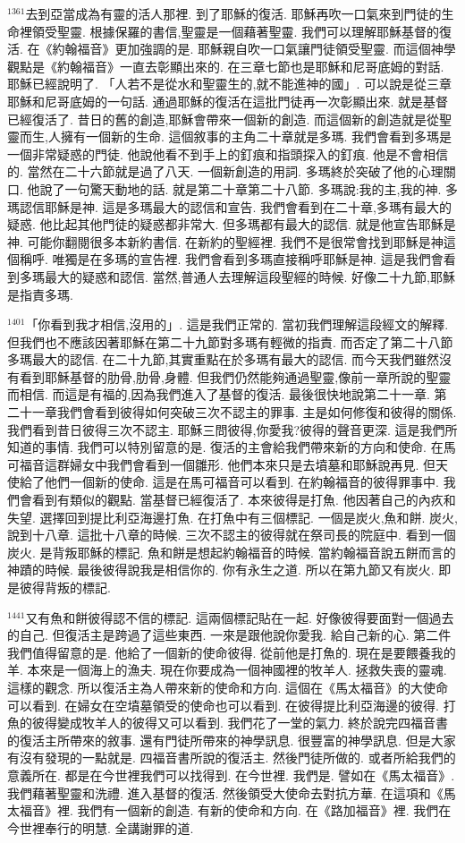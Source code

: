 \documentclass{book}
\begin{document}
$^{1361}$去到亞當成為有靈的活人那裡.
到了耶穌的復活.
耶穌再吹一口氣來到門徒的生命裡領受聖靈.
根據保羅的書信,聖靈是一個藉著聖靈.
我們可以理解耶穌基督的復活.
在《約翰福音》更加強調的是.
耶穌親自吹一口氣讓門徒領受聖靈.
而這個神學觀點是《約翰福音》一直去彰顯出來的.
在三章七節也是耶穌和尼哥底姆的對話.
耶穌已經說明了.
「人若不是從水和聖靈生的,就不能進神的國」.
可以說是從三章耶穌和尼哥底姆的一句話.
通過耶穌的復活在這批門徒再一次彰顯出來.
就是基督已經復活了.
昔日的舊的創造,耶穌會帶來一個新的創造.
而這個新的創造就是從聖靈而生,人擁有一個新的生命.
這個敘事的主角二十章就是多瑪.
我們會看到多瑪是一個非常疑惑的門徒.
他說他看不到手上的釘痕和指頭探入的釘痕.
他是不會相信的.
當然在二十六節就是過了八天.
一個新創造的用詞.
多瑪終於突破了他的心理關口.
他說了一句驚天動地的話.
就是第二十章第二十八節.
多瑪說:我的主,我的神.
多瑪認信耶穌是神.
這是多瑪最大的認信和宣告.
我們會看到在二十章,多瑪有最大的疑惑.
他比起其他門徒的疑惑都非常大.
但多瑪都有最大的認信.
就是他宣告耶穌是神.
可能你翻閱很多本新約書信.
在新約的聖經裡.
我們不是很常會找到耶穌是神這個稱呼.
唯獨是在多瑪的宣告裡.
我們會看到多瑪直接稱呼耶穌是神.
這是我們會看到多瑪最大的疑惑和認信.
當然,普通人去理解這段聖經的時候.
好像二十九節,耶穌是指責多瑪.

$^{1401}$「你看到我才相信,沒用的」.
這是我們正常的.
當初我們理解這段經文的解釋.
但我們也不應該因著耶穌在第二十九節對多瑪有輕微的指責.
而否定了第二十八節多瑪最大的認信.
在二十九節,其實重點在於多瑪有最大的認信.
而今天我們雖然沒有看到耶穌基督的肋骨,肋骨,身體.
但我們仍然能夠通過聖靈,像前一章所說的聖靈而相信.
而這是有福的,因為我們進入了基督的復活.
最後很快地說第二十一章.
第二十一章我們會看到彼得如何突破三次不認主的罪事.
主是如何修復和彼得的關係.
我們看到昔日彼得三次不認主.
耶穌三問彼得,你愛我?彼得的聲音更深.
這是我們所知道的事情.
我們可以特別留意的是.
復活的主會給我們帶來新的方向和使命.
在馬可福音這群婦女中我們會看到一個雛形.
他們本來只是去墳墓和耶穌說再見.
但天使給了他們一個新的使命.
這是在馬可福音可以看到.
在約翰福音的彼得罪事中.
我們會看到有類似的觀點.
當基督已經復活了.
本來彼得是打魚.
他因著自己的內疚和失望.
選擇回到提比利亞海邊打魚.
在打魚中有三個標記.
一個是炭火,魚和餅.
炭火,說到十八章.
這批十八章的時候.
三次不認主的彼得就在祭司長的院庭中.
看到一個炭火.
是背叛耶穌的標記.
魚和餅是想起約翰福音的時候.
當約翰福音說五餅而言的神蹟的時候.
最後彼得說我是相信你的.
你有永生之道.
所以在第九節又有炭火.
即是彼得背叛的標記.

$^{1441}$又有魚和餅彼得認不信的標記.
這兩個標記貼在一起.
好像彼得要面對一個過去的自己.
但復活主是跨過了這些東西.
一來是跟他說你愛我.
給自己新的心.
第二件我們值得留意的是.
他給了一個新的使命彼得.
從前他是打魚的.
現在是要餵養我的羊.
本來是一個海上的漁夫.
現在你要成為一個神國裡的牧羊人.
拯救失喪的靈魂.
這樣的觀念.
所以復活主為人帶來新的使命和方向.
這個在《馬太福音》的大使命可以看到.
在婦女在空墳墓領受的使命也可以看到.
在彼得提比利亞海邊的彼得.
打魚的彼得變成牧羊人的彼得又可以看到.
我們花了一堂的氣力.
終於說完四福音書的復活主所帶來的敘事.
還有門徒所帶來的神學訊息.
很豐富的神學訊息.
但是大家有沒有發現的一點就是.
四福音書所說的復活主.
然後門徒所做的.
或者所給我們的意義所在.
都是在今世裡我們可以找得到.
在今世裡.
我們是.
譬如在《馬太福音》.
我們藉著聖靈和洗禮.
進入基督的復活.
然後領受大使命去對抗方華.
在這項和《馬太福音》裡.
我們有一個新的創造.
有新的使命和方向.
在《路加福音》裡.
我們在今世裡奉行的明慧.
全講謝罪的道.
\end{document}
